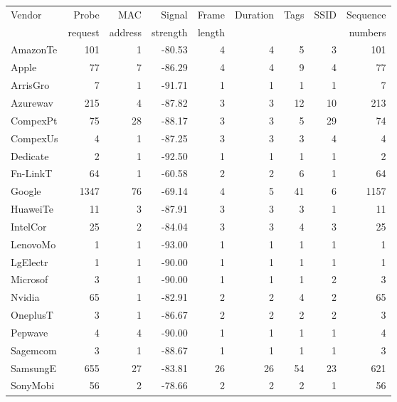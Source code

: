 \begin{table}
\footnotesize
\begin{center}
  \begin{tabular}{lrrrrrrrr}
  \toprule
  Vendor & Probe & MAC & Signal & Frame & Duration & Tags & SSID & Sequence \\ 
  & request & address & strength & length &  &  &  & numbers \\ 
  \midrule
  AmazonTe & 101 &   1 & -80.53 &   4 &   4 &   5 &   3 & 101 \\ 
  Apple &  77 &   7 & -86.29 &   4 &   4 &   9 &   4 &  77 \\ 
  ArrisGro &   7 &   1 & -91.71 &   1 &   1 &   1 &   1 &   7 \\ 
  Azurewav & 215 &   4 & -87.82 &   3 &   3 &  12 &  10 & 213 \\ 
  CompexPt &  75 &  28 & -88.17 &   3 &   3 &   5 &  29 &  74 \\ 
  CompexUs &   4 &   1 & -87.25 &   3 &   3 &   3 &   4 &   4 \\ 
  Dedicate &   2 &   1 & -92.50 &   1 &   1 &   1 &   1 &   2 \\ 
  Fn-LinkT &  64 &   1 & -60.58 &   2 &   2 &   6 &   1 &  64 \\ 
  Google & 1347 &  76 & -69.14 &   4 &   5 &  41 &   6 & 1157 \\ 
  HuaweiTe &  11 &   3 & -87.91 &   3 &   3 &   3 &   1 &  11 \\ 
  IntelCor &  25 &   2 & -84.04 &   3 &   3 &   4 &   3 &  25 \\ 
  LenovoMo &   1 &   1 & -93.00 &   1 &   1 &   1 &   1 &   1 \\ 
  LgElectr &   1 &   1 & -90.00 &   1 &   1 &   1 &   1 &   1 \\ 
  Microsof &   3 &   1 & -90.00 &   1 &   1 &   1 &   2 &   3 \\ 
  Nvidia &  65 &   1 & -82.91 &   2 &   2 &   4 &   2 &  65 \\ 
  OneplusT &   3 &   1 & -86.67 &   2 &   2 &   2 &   2 &   3 \\ 
  Pepwave &   4 &   4 & -90.00 &   1 &   1 &   1 &   1 &   4 \\ 
  Sagemcom &   3 &   1 & -88.67 &   1 &   1 &   1 &   1 &   3 \\ 
  SamsungE & 655 &  27 & -83.81 &  26 &  26 &  54 &  23 & 621 \\ 
  SonyMobi &  56 &   2 & -78.66 &   2 &   2 &   2 &   1 &  56 \\ 

\end{tabular}
\end{center}
\end{table}
